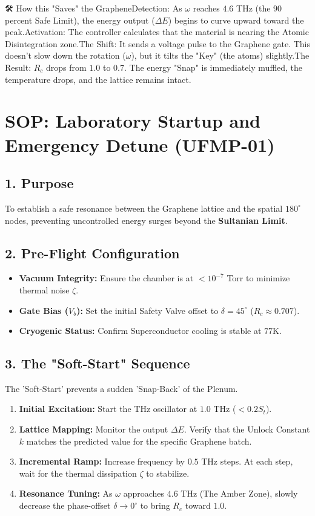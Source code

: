 \documentclass[11pt]{article}
\begin{document}
🛠 How this "Saves" the GrapheneDetection: As $\omega$ reaches $4.6$ THz (the 90 percent Safe Limit), the energy output ($\Delta E$) begins to curve upward toward the peak.Activation: The controller calculates that the material is nearing the Atomic Disintegration zone.The Shift: It sends a voltage pulse to the Graphene gate. This doesn't slow down the rotation ($\omega$), but it tilts the "Key" (the atoms) slightly.The Result: $R_c$ drops from $1.0$ to $0.7$. The energy "Snap" is immediately muffled, the temperature drops, and the lattice remains intact.


\section*{SOP: Laboratory Startup and Emergency Detune (UFMP-01)}

\subsection*{1. Purpose}
To establish a safe resonance between the Graphene lattice and the spatial $180^\circ$ nodes, preventing uncontrolled energy surges beyond the \textbf{Sultanian Limit}.

\subsection*{2. Pre-Flight Configuration}
\begin{itemize}
    \item \textbf{Vacuum Integrity:} Ensure the chamber is at $< 10^{-7}$ Torr to minimize thermal noise $\zeta$.
    \item \textbf{Gate Bias ($V_b$):} Set the initial Safety Valve offset to $\delta = 45^\circ$ ($R_c \approx 0.707$).
    \item \textbf{Cryogenic Status:} Confirm Superconductor cooling is stable at $77$K.
\end{itemize}

\subsection*{3. The "Soft-Start" Sequence}
The 'Soft-Start' prevents a sudden 'Snap-Back' of the Plenum.
\begin{enumerate}
    \item \textbf{Initial Excitation:} Start the THz oscillator at $1.0$ THz ($< 0.2 S_t$).
    \item \textbf{Lattice Mapping:} Monitor the output $\Delta E$. Verify that the Unlock Constant $k$ matches the predicted value for the specific Graphene batch.
    \item \textbf{Incremental Ramp:} Increase frequency by $0.5$ THz steps. At each step, wait for the thermal dissipation $\zeta$ to stabilize.
    \item \textbf{Resonance Tuning:} As $\omega$ approaches $4.6$ THz (The Amber Zone), slowly decrease the phase-offset $\delta \to 0^\circ$ to bring $R_c$ toward $1.0$.
\end{enumerate}
\end{document}

